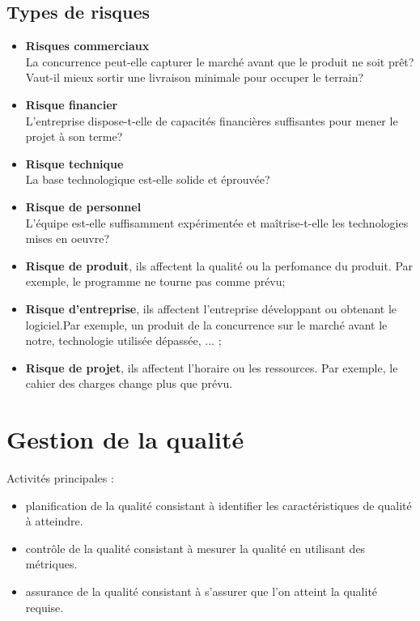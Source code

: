\documentclass{article}
\newcommand{\ora}[1]{\textcolor{darko}{#1}}
\begin{document}
\begin{sffamily}
\subsection{Types de risques}

\begin{itemize}
\item \textbf{Risques commerciaux} \\
La concurrence peut-elle capturer le marché avant que le produit ne soit prêt? Vaut-il mieux sortir une livraison minimale pour 
occuper le terrain?
\item \textbf{Risque financier} \\
L'entreprise dispose-t-elle de capacités financières suffisantes pour mener le projet à son terme?
\item \textbf{Risque technique} \\
La base technologique est-elle solide et éprouvée? 
\item \textbf{Risque de personnel} \\
L'équipe est-elle suffisamment expérimentée et maîtrise-t-elle les technologies mises en oeuvre?
\item \textbf{Risque de produit}, ils affectent la qualité ou la perfomance du produit. Par exemple, le programme ne tourne pas 
comme prévu;
\item \textbf{Risque d'entreprise}, ils affectent l'entreprise développant ou obtenant le logiciel.Par exemple, un produit de la 
concurrence sur le marché avant le notre, technologie utilisée dépassée, ... ;
\item \textbf{Risque de projet}, ils affectent l'horaire ou les ressources. Par exemple, le cahier des charges change plus que 
prévu.
\end{itemize}

\section{Gestion de la qualité}

Activités principales :
\begin{itemize}
\item \ora{planification de la qualité} consistant à identifier les caractéristiques de qualité à atteindre.
\item \ora{contrôle de la qualité} consistant à mesurer la qualité en utilisant des métriques.
\item \ora{assurance de la qualité} consistant à s'assurer que l'on atteint la qualité requise.
\end{itemize}


\end{sffamily}
\end{document}
